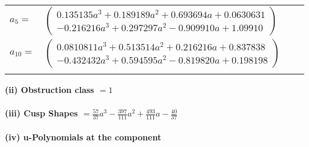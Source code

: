 \documentclass[1p]{elsarticle_modified}
\theoremstyle{definition}
\begin{document}
\begin{tabular}{m{7pt} m{180pt} m{7pt} m{180pt} }
\flushright $a_{5}=$&$\begin{pmatrix}0.135135 a^{3}+0.189189 a^{2}+0.693694 a+0.0630631\\-0.216216 a^{3}+0.297297 a^{2}-0.909910 a+1.09910\end{pmatrix}$ \\
\flushright $a_{10}=$&$\begin{pmatrix}0.0810811 a^{3}+0.513514 a^{2}+0.216216 a+0.837838\\-0.432432 a^{3}+0.594595 a^{2}-0.819820 a+0.198198\end{pmatrix}$\\&\end{tabular}
\flushleft \textbf{(ii) Obstruction class $= 1$}\\~\\
\flushleft \textbf{(iii) Cusp Shapes $= \frac{57}{37} a^3-\frac{397}{111} a^2+\frac{493}{111} a-\frac{40}{37}$}\\~\\
\newpage\renewcommand{\arraystretch}{1}
\flushleft \textbf{(iv) u-Polynomials at the component}\newline \\
\end{document}
